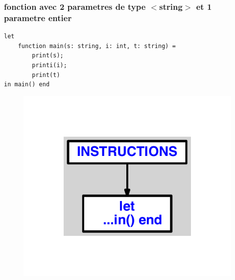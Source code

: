 \documentclass{article}
\begin{document}
\subsubsection{fonction avec 2 parametres de type $ < $string$ > $ et 1 parametre entier}
\begin{lstlisting}
let
	function main(s: string, i: int, t: string) =
		print(s);
		printi(i);
		print(t)
in main() end
\end{lstlisting}
\newpage
\begin{figure}[H]
\centering
\includegraphics[max width=\textwidth]{ast/ast_243.pdf}
\end{figure}
\newpage
\end{document}
